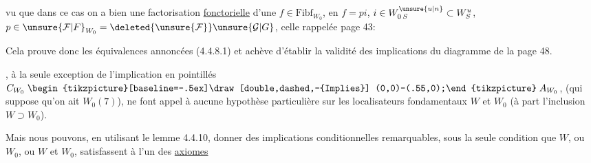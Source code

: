
vu que dans ce cas on a bien une factorisation \uline{fonctorielle} d'une $f\in\mathrm{Fibf}_{W_0}$,  en $f=pi$, $i\in W_{0\,S}^{\unsure{u|n}}\subset W_S^u$, $p\in\unsure{\mathcal{F}|F}_{W_0}=\deleted{\unsure{\mathcal{F}}}\unsure{\mathcal{G}|G}$,  celle rappelée page 43:


Cela prouve donc les équivalences annoncées (4.4.8.1) et achève d'établir la validité des implications du diagramme de la page 48.

  , à la seule exception de l'implication en pointillés $C_{W_0}\mathrel{\begin{tikzpicture}[baseline=-.5ex]\draw[double,dashed,-{Implies}] (0,0)--(.55,0);\end{tikzpicture}}A_{W_0}$,  (qui suppose qu'on ait $W_0(7)$), ne font appel à aucune hypothèse particulière sur les localisateurs fondamentaux $W$ et $W_0$ (à part l'inclusion $W\supset W_0$).

Mais nous pouvons, en utilisant le lemme 4.4.10, donner des implications conditionnelles remarquables, sous la seule condition que $W$, ou $W_0$, ou $W$ et $W_0$, satisfassent à l'un des \uline{axiomes}
